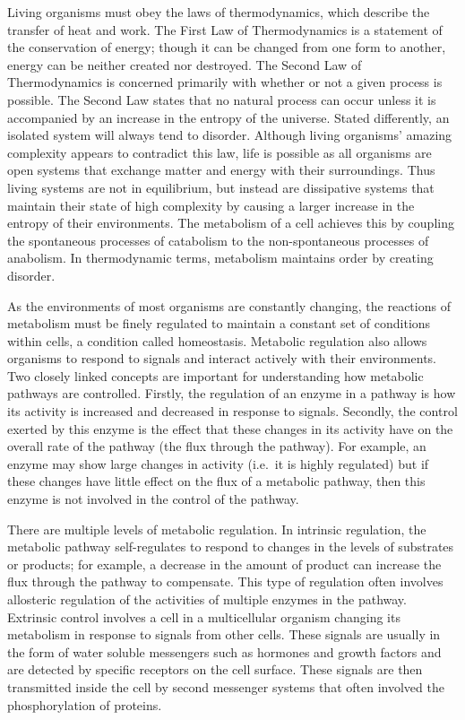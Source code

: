 Living organisms must obey the laws of thermodynamics, which describe the transfer of heat and work. The First Law of Thermodynamics is a statement of the conservation of energy; though it can be changed from one form to another, energy can be neither created nor destroyed. The Second Law of Thermodynamics is concerned primarily with whether or not a given process is possible. The Second Law states that no natural process can occur unless it is accompanied by an increase in the entropy of the universe. Stated differently, an isolated system will always tend to disorder. Although living organisms' amazing complexity appears to contradict this law, life is possible as all organisms are open systems that exchange matter and energy with their surroundings. Thus living systems are not in equilibrium, but instead are dissipative systems that maintain their state of high complexity by causing a larger increase in the entropy of their environments. The metabolism of a cell achieves this by coupling the spontaneous processes of catabolism to the non-spontaneous processes of anabolism. In thermodynamic terms, metabolism maintains order by creating disorder.

As the environments of most organisms are constantly changing, the reactions of metabolism must be finely regulated to maintain a constant set of conditions within cells, a condition called homeostasis. Metabolic regulation also allows organisms to respond to signals and interact actively with their environments. Two closely linked concepts are important for understanding how metabolic pathways are controlled. Firstly, the regulation of an enzyme in a pathway is how its activity is increased and decreased in response to signals. Secondly, the control exerted by this enzyme is the effect that these changes in its activity have on the overall rate of the pathway (the flux through the pathway). For example, an enzyme may show large changes in activity (i.e.~it is highly regulated) but if these changes have little effect on the flux of a metabolic pathway, then this enzyme is not involved in the control of the pathway.

There are multiple levels of metabolic regulation. In intrinsic regulation, the metabolic pathway self-regulates to respond to changes in the levels of substrates or products; for example, a decrease in the amount of product can increase the flux through the pathway to compensate. This type of regulation often involves allosteric regulation of the activities of multiple enzymes in the pathway. Extrinsic control involves a cell in a multicellular organism changing its metabolism in response to signals from other cells. These signals are usually in the form of water soluble messengers such as hormones and growth factors and are detected by specific receptors on the cell surface. These signals are then transmitted inside the cell by second messenger systems that often involved the phosphorylation of proteins.

